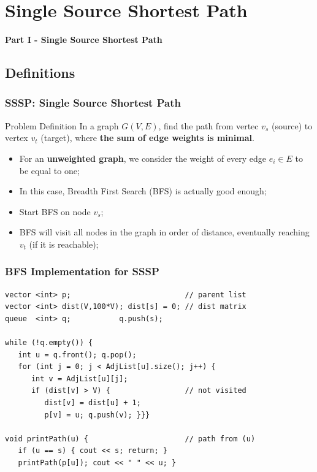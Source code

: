 \section{Single Source Shortest Path}

\begin{frame}
  \begin{center}
    {\bf Part I - Single Source Shortest Path}
  \end{center}
\end{frame}

\subsection{Definitions}
\begin{frame}
  \frametitle{SSSP: Single Source Shortest Path}
  \begin{block}{Problem Definition}
    In a graph $G(V,E)$, find the path from vertec $v_s$ (source) to vertex $v_t$ (target), where {\bf the sum of edge weights is minimal}.
  \end{block}\bigskip

  \begin{itemize}
  \item For an {\bf unweighted graph}, we consider the weight of every edge $e_i \in E$ to be equal to one;\medskip

  \item In this case, Breadth First Search (BFS) is actually good enough;\medskip

  \item Start BFS on node $v_s$;\medskip

  \item BFS will visit all nodes in the graph in order of distance, eventually reaching $v_t$ (if it is reachable);
  \end{itemize}
\end{frame}

\begin{frame}[fragile]
  \frametitle{BFS Implementation for SSSP}

{\smaller
\begin{exampleblock}{}
\begin{verbatim}
vector <int> p;                          // parent list
vector <int> dist(V,100*V); dist[s] = 0; // dist matrix
queue  <int> q;           q.push(s);

while (!q.empty()) {
   int u = q.front(); q.pop();
   for (int j = 0; j < AdjList[u].size(); j++) {
      int v = AdjList[u][j];
      if (dist[v] > V) {                 // not visited
         dist[v] = dist[u] + 1;
         p[v] = u; q.push(v); }}}

void printPath(u) {                      // path from (u)
   if (u == s) { cout << s; return; }
   printPath(p[u]); cout << " " << u; }
\end{verbatim}
\end{exampleblock}
}
\end{frame}

